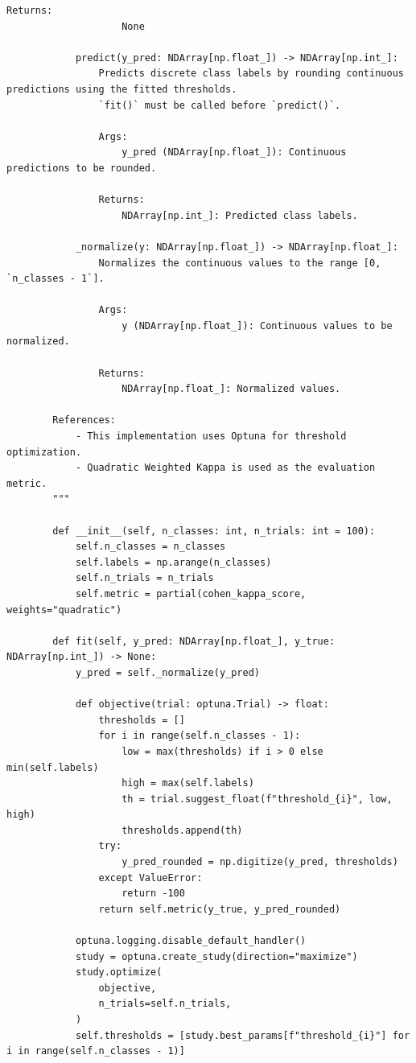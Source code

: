\begin{appendices}
\begin{mdframed}
\begin{lstlisting}[breaklines=true]
                Returns:
                    None

            predict(y_pred: NDArray[np.float_]) -> NDArray[np.int_]:
                Predicts discrete class labels by rounding continuous predictions using the fitted thresholds.
                `fit()` must be called before `predict()`.

                Args:
                    y_pred (NDArray[np.float_]): Continuous predictions to be rounded.

                Returns:
                    NDArray[np.int_]: Predicted class labels.

            _normalize(y: NDArray[np.float_]) -> NDArray[np.float_]:
                Normalizes the continuous values to the range [0, `n_classes - 1`].

                Args:
                    y (NDArray[np.float_]): Continuous values to be normalized.

                Returns:
                    NDArray[np.float_]: Normalized values.

        References:
            - This implementation uses Optuna for threshold optimization.
            - Quadratic Weighted Kappa is used as the evaluation metric.
        """

        def __init__(self, n_classes: int, n_trials: int = 100):
            self.n_classes = n_classes
            self.labels = np.arange(n_classes)
            self.n_trials = n_trials
            self.metric = partial(cohen_kappa_score, weights="quadratic")

        def fit(self, y_pred: NDArray[np.float_], y_true: NDArray[np.int_]) -> None:
            y_pred = self._normalize(y_pred)

            def objective(trial: optuna.Trial) -> float:
                thresholds = []
                for i in range(self.n_classes - 1):
                    low = max(thresholds) if i > 0 else min(self.labels)
                    high = max(self.labels)
                    th = trial.suggest_float(f"threshold_{i}", low, high)
                    thresholds.append(th)
                try:
                    y_pred_rounded = np.digitize(y_pred, thresholds)
                except ValueError:
                    return -100
                return self.metric(y_true, y_pred_rounded)

            optuna.logging.disable_default_handler()
            study = optuna.create_study(direction="maximize")
            study.optimize(
                objective,
                n_trials=self.n_trials,
            )
            self.thresholds = [study.best_params[f"threshold_{i}"] for i in range(self.n_classes - 1)]


\end{lstlisting}
\end{mdframed}
\end{appendices}
